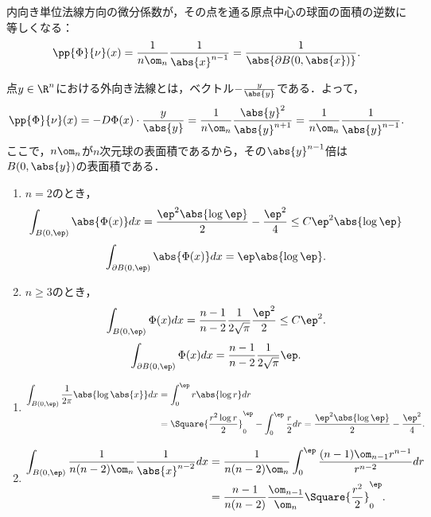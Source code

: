 \documentclass[uplatex,dvipdfmx]{jsreport}
\begin{document}
\begin{corollary}[基本解の係数の設計意図]\label{lemma-design-of-fundamental-solution-of-Poisson-equation}
    内向き単位法線方向の微分係数が，その点を通る原点中心の球面の面積の逆数に等しくなる：
    \[\pp{\Phi}{\nu}(x)=\frac{1}{n\om_n}\frac{1}{\abs{x}^{n-1}}=\frac{1}{\abs{\partial B(0,\abs{x})}}.\]
\end{corollary}
\begin{Proof}
    点$y\in\R^n$における外向き法線とは，ベクトル$-\frac{y}{\abs{y}}$である．よって，
    \[\pp{\Phi}{\nu}(x)=-D\Phi(x)\cdot\frac{y}{\abs{y}}=\frac{1}{n\om_n}\frac{\abs{y}^2}{\abs{y}^{n+1}}=\frac{1}{n\om_n}\frac{1}{\abs{y}^{n-1}}.\]
    ここで，$n\om_n$が$n$次元球の表面積であるから，その$\abs{y}^{n-1}$倍は$B(0,\abs{y})$の表面積である．
\end{Proof}

\begin{proposition}[原点の近傍での積分の評価]\mbox{}
    \begin{enumerate}
        \item $n=2$のとき，
        \[\int_{B(0,\ep)}\abs{\Phi(x)}dx=\frac{\ep^2\abs{\log\ep}}{2}-\frac{\ep^2}{4}\le C\ep^2\abs{\log\ep}\]
        \[\int_{\partial B(0,\ep)}\abs{\Phi(x)}dx=\ep\abs{\log\ep}.\]
        \item $n\ge3$のとき，
        \[\int_{B(0,\ep)}\Phi(x)dx=\frac{n-1}{n-2}\frac{1}{2\sqrt{\pi}}\frac{\ep^2}{2}\le C\ep^2.\]
        \[\int_{\partial B(0,\ep)}\Phi(x)dx=\frac{n-1}{n-2}\frac{1}{2\sqrt{\pi}}\ep.\]
    \end{enumerate}
\end{proposition}
\begin{Proof}\mbox{}
    \begin{enumerate}
        \item \begin{align*}
            \int_{B(0,\ep)}\frac{1}{2\pi}\abs{\log\abs{x}}dx&=\int^\ep_0r\abs{\log r}dr\\
            &=\Square{\frac{r^2\log r}{2}}^\ep_0-\int^\ep_0\frac{r}{2}dr=\frac{\ep^2\abs{\log\ep}}{2}-\frac{\ep^2}{4}.
        \end{align*}
        \item \begin{align*}
            \int_{B(0,\ep)}\frac{1}{n(n-2)\om_n}\frac{1}{\abs{x}^{n-2}}dx&=\frac{1}{n(n-2)\om_n}\int_0^\ep\frac{(n-1)\om_{n-1}r^{n-1}}{r^{n-2}}dr\\
            &=\frac{n-1}{n(n-2)}\frac{\om_{n-1}}{\om_n}\Square{\frac{r^{2}}{2}}^\ep_0.
            \end{align*}
    \end{enumerate}
\end{Proof}
\end{document}
